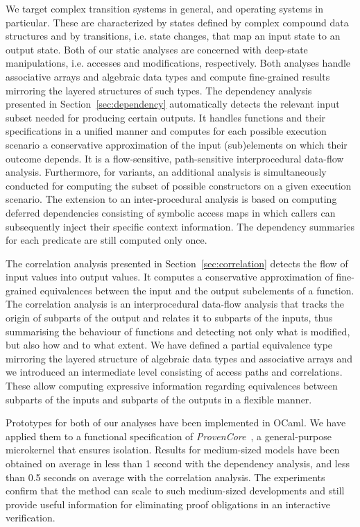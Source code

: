 \documentclass[11pt]{article}
\def\pcore{\textsf{ProvenCore}}
\begin{document}
We target complex transition systems in general, and operating
systems in particular. These are characterized by states defined
by complex compound data structures and by transitions, i.e. state changes, 
that map an input state to an output state. Both of our static analyses are
concerned with deep-state manipulations, i.e. accesses and modifications, 
respectively. Both analyses handle associative arrays and algebraic data
types and compute fine-grained results mirroring the layered structures of
such types. 
%
The dependency analysis presented in Section~\ref{sec:dependency}
automatically detects the relevant input subset needed for producing
certain outputs. It handles functions and their specifications in a
unified manner and computes for each possible execution scenario a
conservative approximation of the input (sub)elements on which their
outcome depends. It is a flow-sensitive, path-sensitive
interprocedural data-flow analysis. Furthermore, for variants, an
additional analysis is simultaneously conducted for computing the
subset of possible constructors on a given execution scenario. The
extension to an inter-procedural analysis is based on computing
deferred dependencies consisting of symbolic access maps in which
callers can subsequently inject their specific context information.
The dependency summaries for each predicate are still computed only once.

The correlation analysis presented in Section~\ref{sec:correlation}
detects the flow of input values into output values. It computes a
conservative approximation of fine-grained equivalences between the
input and the output subelements of a function. The correlation
analysis is an interprocedural data-flow analysis that tracks the
origin of subparts of the output and relates it to subparts of the
inputs, thus summarising the behaviour of functions and detecting not
only what is modified, but also how and to what extent. We have
defined a partial equivalence type mirroring the layered structure of
algebraic data types and associative arrays and we introduced an
intermediate level consisting of access paths and correlations. These
allow computing expressive information regarding equivalences between
subparts of the inputs and subparts of the outputs in a flexible
manner.

Prototypes for both of our analyses have been implemented in
\textsf{OCaml}.  We have applied them to a functional specification of
\emph{\pcore}~\cite{lescuyer15}, a general-purpose microkernel that
ensures isolation. Results for medium-sized models have been obtained
on average in less than 1 second with the dependency analysis, and
less than 0.5 seconds on average with the correlation analysis.
The experiments confirm that the method can scale to such medium-sized
developments and still provide useful information for eliminating
proof obligations in an interactive verification. 





\end{document}

